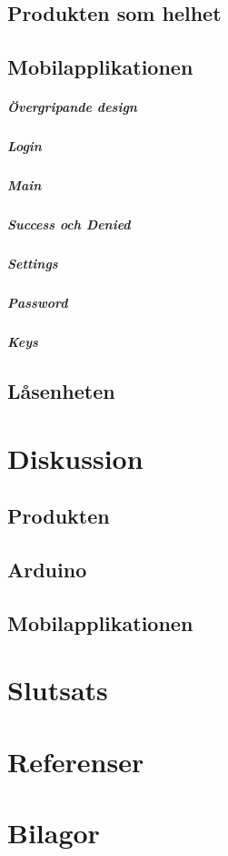 \documentclass[11pt]{article}
\begin{document}
\subsection{Produkten som helhet}

\subsection{Mobilapplikationen}

\subparagraph{Övergripande design}

\subparagraph{Login}

\subparagraph{Main}

\subparagraph{Success och Denied}

\subparagraph{Settings}

\subparagraph{Password}

\subparagraph{Keys}

\subsection{Låsenheten}

\section{Diskussion}

\subsection{Produkten}

\subsection{Arduino}

\subsection{Mobilapplikationen}

\section{Slutsats}

\section*{Referenser}

\section*{Bilagor}
\end{document}
